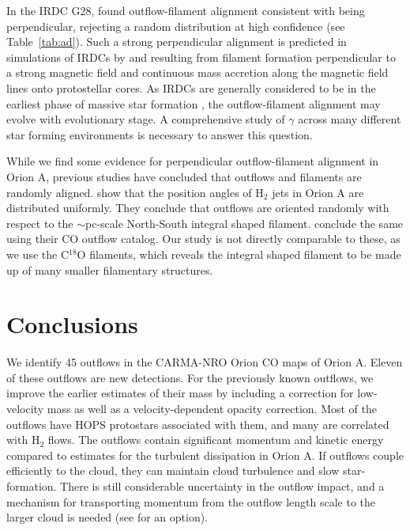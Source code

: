 \documentclass[twocolumn]{aastex63}
\begin{document}
In the IRDC G28, \citet{Kong19} found outflow-filament alignment consistent with being perpendicular, rejecting a random distribution at high confidence (see Table~\ref{tab:ad}). Such a strong perpendicular alignment is predicted in simulations of IRDCs by \citet{Li18} and \citet{Li19} resulting from filament formation perpendicular to a strong magnetic field and continuous mass accretion along the magnetic field lines onto protostellar cores. As IRDCs are generally considered to be in the earliest phase of massive star formation \citep{Rathborne06}, the outflow-filament alignment may evolve with evolutionary stage. A comprehensive study of $\gamma$ across many different star forming environments is necessary to answer this question.

While we find some evidence for perpendicular outflow-filament alignment in Orion A, previous studies have concluded that outflows and filaments are randomly aligned. \citet{Davis09} show that the position angles of H$_2$ jets in Orion A are distributed uniformly. They conclude that outflows are oriented randomly with respect to the $\sim$pc-scale North-South integral shaped filament. \citet{Tanabe:submitted} conclude the same using their CO outflow catalog. Our study is not directly comparable to these, as we use the C$^18$O filaments, which reveals the integral shaped filament to be made up of many smaller filamentary structures.



\section{Conclusions}

We identify 45 outflows in the CARMA-NRO Orion CO maps of Orion A. Eleven of these outflows are new detections. For the previously known outflows, we improve the earlier estimates of their mass by including a correction for low-velocity mass as well as a velocity-dependent opacity correction. Most of the outflows have HOPS protostars associated with them, and many are correlated with H$_2$ flows.
The outflows contain significant momentum and kinetic energy compared to estimates for the turbulent dissipation in Orion A. If outflows couple efficiently to the cloud, they can maintain cloud turbulence and slow star-formation. There is still considerable uncertainty in the outflow impact, and a mechanism for transporting momentum from the outflow length scale to the larger cloud is needed (see \citealp{Offner18} for an option).
\end{document}
